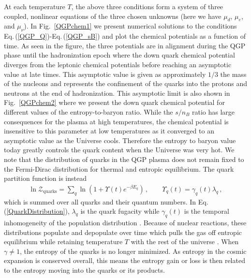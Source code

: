\documentclass[universe,article,submit,moreauthors,pdftex,a4paper]{Definitions/mdpi}
\newcommand{\req}[1]{Eq.\,(\ref{#1})}
\newcommand*{\rf}[1]{Fig.~{\ref{#1}}}
\begin{document}
At each temperature $T$, the above three conditions form a system of three coupled, nonlinear equations of the three chosen unknowns (here we have $\mu_d$, $\mu_e$, and $\mu_\nu$). In \rf{QGPchem1} we present numerical solutions to the conditions \req{QGP_Q}-\req{QGP_sB} and plot the chemical potentials as a function of time. As seen in the figure, the three potentials are in alignment during the QGP phase until the hadronization epoch where the down quark chemical potential diverges from the leptonic chemical potentials before reaching an asymptotic value at late times. This asymptotic value is given as approximately $1/3$ the mass of the nucleons and represents the confinement of the quarks into the protons and neutrons at the end of hadronization. This asymptotic limit is also shown in \rf{QGPchem2} where we present the down quark chemical potential for different values of the entropy-to-baryon ratio. While the $s/n_{B}$ ratio has large consequences for the plasma at high temperatures, the chemical potential is insensitive to this parameter at low temperatures as it converged to an asymptotic value as the Universe cools. Therefore the entropy to baryon value today greatly controls the quark content when the Universe was very hot. We note that the distribution of quarks in the QGP plasma does not remain fixed to the Fermi-Dirac distribution for thermal and entropic equilibrium. The quark partition function is instead
\begin{align}
  \label{QuarkDistribution}\ln\mathcal{Z}_{\mathrm{quarks}}=\sum_{q}\ln\left(1+\Upsilon(t)e^{-\beta E_{q}}\right)\,,\qquad\Upsilon_{q}(t)=\gamma_{q}(t)\lambda_{q}\,,
\end{align}
which is summed over all quarks and their quantum numbers. In \req{QuarkDistribution}, $\lambda_{q}$ is the quark fugacity while $\gamma_{q}(t)$ is the temporal inhomogeneity of the population distribution \cite{Rafelski:2019twp}. Because of nuclear reactions, these distributions populate and depopulate over time which pulls the gas off entropic equilibrium while retaining temperature $T$ with the rest of the universe \cite{Letessier:2002gp}. When $\gamma\neq1$, the entropy of the quarks is no longer minimized. As entropy in the cosmic expansion is conserved overall, this means the entropy gain or loss is then related to the entropy moving into the quarks or its products.
\end{document}
